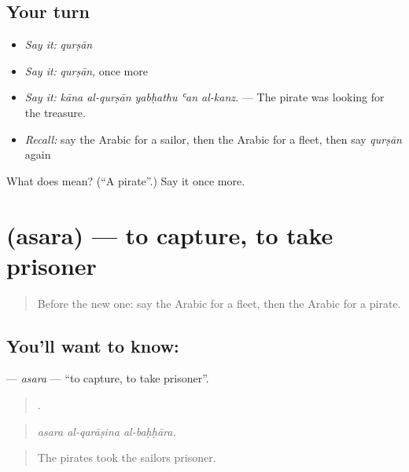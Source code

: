 \subsection*{Your turn}
\begin{itemize}
\raggedright
  \item \emph{Say it:} \emph{qurṣān}
  \item \emph{Say it:} \emph{qurṣān}, once more
  \item \emph{Say it:} \emph{kāna al-qurṣān yabḥathu ʿan al-kanz.} — The pirate was looking for the treasure.
  \item \emph{Recall:} say the Arabic for a sailor, then the Arabic for a fleet, then say \emph{qurṣān} again
\end{itemize}

\begin{tcolorbox}[breakable,colback=teal!4,colframe=teal!35!black,title={Before you move on}]
What does  mean? (\textquotedblleft{}A pirate\textquotedblright{}.) Say it once more.
\end{tcolorbox}
\section[\texorpdfstring{\ar{أسر} (asara)}{أسر (asara)}]{ (asara) — to capture, to take prisoner}

\label{lesson:AR-C333-asara}



\begin{quote}
Before the new one: say the Arabic for a fleet, then the Arabic for a pirate.
\end{quote}

\subsection*{You'll want to know: }
\textbf{} — \emph{asara} — \textquotedblleft{}to capture, to take prisoner\textquotedblright{}.

\begin{quote}
  .
\end{quote}

\begin{quote}
\emph{asara al-qarāṣina al-baḥḥāra.}
\end{quote}

\begin{quote}
The pirates took the sailors prisoner.
\end{quote}

